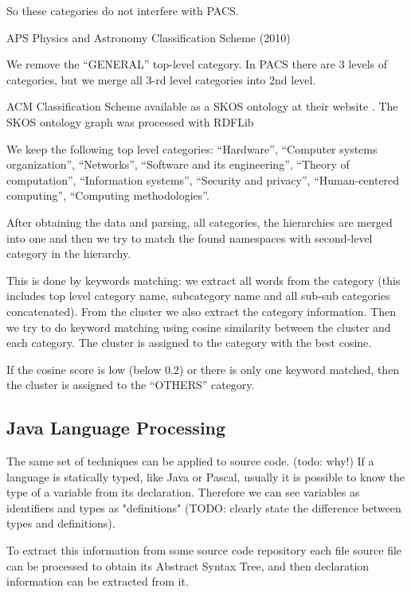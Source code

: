 So these categories do not interfere with PACS. 


APS Physics and Astronomy Classification Scheme (2010) \cite{aps2010pacs}

We remove the ``GENERAL'' top-level category. 
In PACS there are 3 levels of categories, but we merge all 3-rd level categories into 
2nd level.

ACM Classification Scheme \cite{rous2012acm} available as a SKOS \cite{miles2005skos} ontology 
at their website \cite{amc2012ccs}. The SKOS ontology graph was processed with RDFLib \cite{rdflib}

We keep the following top level categories:
``Hardware'', ``Computer systems organization'', ``Networks'', 
``Software and its engineering'', ``Theory of computation'', 
``Information systems'', ``Security and privacy'',
``Human-centered computing'', ``Computing methodologies''.

After obtaining the data and parsing, all categories, the hierarchies 
are merged into one and then we try to match the found namespaces 
with second-level category in the hierarchy. 

This is done by keywords matching: we extract all words from the 
category (this includes top level category name, subcategory name
and all sub-sub categories concatenated). From the cluster 
we also extract the category information.
Then we try to do keyword matching using cosine similarity 
between the cluster and each category. The cluster is assigned 
to the category with the best cosine. 

If the cosine score is low (below $0.2$) or there is only one 
keyword matched, then the cluster is assigned to the ``OTHERS'' 
category.


\subsection{Java Language Processing} \label{sec:jlp}

The same set of techniques can be applied to source code.
(todo: why!)
If a language 
is statically typed, like Java or Pascal, usually it is possible to know the
type of a variable from its declaration. Therefore we can see 
variables as identifiers and types as "definitions" (TODO: clearly state 
the difference between types and definitions).

To extract this information from some source code repository each file source
file can be processed to obtain its Abstract Syntax Tree, and then 
declaration information can be extracted from it. 


